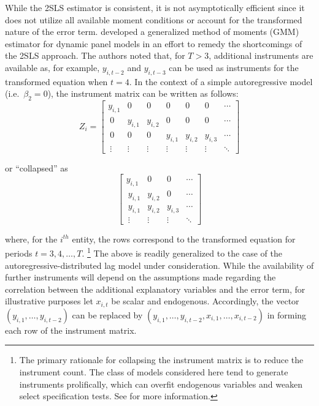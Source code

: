 \documentclass[english]{article}
\begin{document}
While the 2SLS estimator is consistent, it is not asymptotically efficient 
since it does not utilize all available moment conditions or account for the 
transformed nature of the error term. 
\citet{arellano1991} developed a generalized method of moments (GMM) 
estimator for dynamic panel models in an effort to remedy the shortcomings 
of the 2SLS approach. 
The authors noted that, for $T>3$, additional instruments are available as, 
for example, $y_{i,t-2}$ and $y_{i,t-3}$ can be used as instruments for the 
transformed equation when $t=4$.
In the context of a simple autoregressive model (i.e.\ $\beta_2=0$), the 
instrument matrix can be written as follows:
\begin{equation}
Z_i = \left[ 
\begin{array}{ccccccc}
y_{i,1} & 0 & 0 & 0 & 0 & 0 & \cdots   \\\
0 & y_{i,1} & y_{i,2} & 0 & 0 & 0 & \cdots   \\\
0 & 0 & 0 & y_{i,1} & y_{i,2} & y_{i,3} & \cdots  \\\
\vdots & \vdots & \vdots & \vdots & \vdots & \vdots & \ddots
\end{array}
\right]
\label{z}
\end{equation}

\noindent
or ``collapsed'' as 
\begin{equation}
\left[ 
\begin{array}{ccccccc}
y_{i,1} & 0 & 0 & \cdots   \\\
y_{i,1} & y_{i,2} & 0 & \cdots   \\\
y_{i,1} & y_{i,2} & y_{i,3} & \cdots  \\\
\vdots & \vdots & \vdots & \ddots
\end{array}
\right]
\label{zc}
\end{equation}

\noindent
where, for the $i^{th}$ entity, the rows correspond to the transformed 
equation for periods $t=3,4,\ldots,T$.%
\footnote{The primary rationale for collapsing the instrument matrix is to
reduce the instrument count.  
The class of models considered here tend to generate instruments 
prolifically, which can overfit endogenous variables and weaken select
specification tests.
See \citet{roodman2009b} for more information.}
The above is readily generalized to the case of the autoregressive-distributed 
lag model under consideration. 
While the availability of further instruments will depend on the assumptions 
made regarding the correlation between the additional explanatory variables 
and the error term, for illustrative purposes let $x_{i,t}$ be scalar and 
endogenous. 
Accordingly, the vector $(y_{i,1}, \ldots, y_{i,t-2})$ can be replaced by 
$(y_{i,1}, \ldots, y_{i,t-2}, x_{i,1},\ldots,  x_{i,t-2})$ in forming 
each row of the instrument matrix. 
\end{document}

